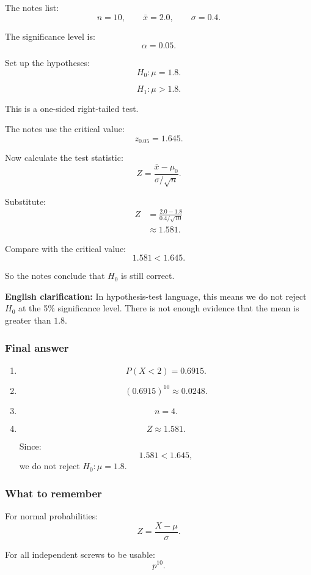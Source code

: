 \documentclass[10pt]{article}
\begin{document}
The notes list:
\[
n=10,
\qquad
\bar{x}=2.0,
\qquad
\sigma=0.4.
\]

The significance level is:
\[
\alpha=0.05.
\]

Set up the hypotheses:
\[
H_0:\mu=1.8.
\]

\[
H_1:\mu>1.8.
\]

This is a one-sided right-tailed test.

The notes use the critical value:
\[
z_{0.05}=1.645.
\]

Now calculate the test statistic:
\[
Z=
\frac{\bar{x}-\mu_0}{\sigma/\sqrt{n}}.
\]

Substitute:
\begin{align*}
Z
&=
\frac{2.0-1.8}{0.4/\sqrt{10}}
\\[2mm]
&\approx
1.581.
\end{align*}

Compare with the critical value:
\[
1.581<1.645.
\]

So the notes conclude that \(H_0\) is still correct.

\textbf{English clarification:}
In hypothesis-test language, this means we do not
reject \(H_0\) at the 5\% significance level.
There is not enough evidence that the mean is greater
than \(1.8\).

\subsubsection*{Final answer}

\begin{enumerate}[label=\alph*)]
\item
\[
P(X<2)=0.6915.
\]

\item
\[
(0.6915)^{10}\approx 0.0248.
\]

\item
\[
n=4.
\]

\item
\[
Z\approx 1.581.
\]

Since:
\[
1.581<1.645,
\]
we do not reject \(H_0:\mu=1.8\).
\end{enumerate}

\subsubsection*{What to remember}

For normal probabilities:
\[
Z=\frac{X-\mu}{\sigma}.
\]

For all independent screws to be usable:
\[
p^{10}.
\]
\end{document}

